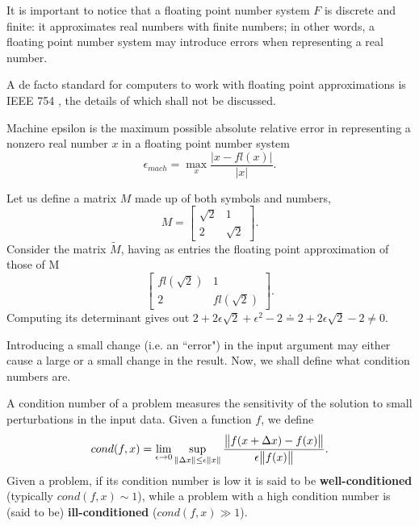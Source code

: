 It is important to notice that a floating point number system \(F\) is discrete and finite: it approximates real numbers with
finite numbers; in other words, a floating point number system may introduce errors when representing a real number.

A de facto standard for computers to work with floating point approximations is IEEE 754 \cite{ieeefp}, the details of which
shall not be discussed.

\begin{definition} \cite[p. 49]{numerical-mathematics}
    Machine epsilon is the maximum possible absolute relative error in representing a nonzero real number \(x\) in a
    floating point number system
    \[\epsilon_{mach} = \max \limits_{x} \dfrac{\vert x - fl(x) \vert}{\vert x \vert}.\]
\end{definition}

\begin{example}
    Let us define a matrix $M$ made up of both symbols and numbers,
    \[
        M = \begin{bmatrix}
            \sqrt{2}  &   1    \\
                2     & \sqrt{2}
        \end{bmatrix}.
    \]
    Consider the matrix \( \tilde{M} \), having as entries the floating point approximation of those of M
    \[
        \begin{bmatrix}
            fl(\sqrt{2})      &         1      \\
                2             &    fl(\sqrt{2})
        \end{bmatrix}.
    \]
    Computing its determinant gives out \( 2  +2\epsilon\sqrt{2} + \epsilon^2 - 2 \doteq 2 + 2\epsilon\sqrt{2} -2 \neq 0 \).
\end{example}

Introducing a small change (i.e. an ``error") in the input argument may either cause a large or a small change in the result.
Now, we shall define what condition numbers are.

\begin{definition}\cite[p. 33]{numerical-mathematics}
    A condition number of a problem measures the sensitivity of the solution to small perturbations in the input data.
    Given a function \(f \), we define
    \[
        cond(f, x) = \lim_{\epsilon \to 0} \sup \limits_{\norm{\Delta x} \leq \epsilon \norm{x}}
        \dfrac{\norm{f(x+\Delta x) - f(x)}}{\epsilon \norm{f(x)}}.
    \]
    Given a problem, if its condition number is low it is said to be \textbf{well-conditioned}
    (typically \( cond(f, x) \sim 1 \)), while a problem with a high condition number is (said to be)
    \textbf{ill-conditioned} (\( cond(f, x) \gg 1 \)).
\end{definition}

